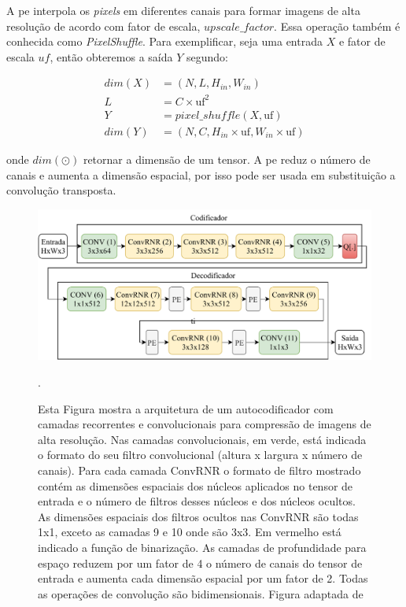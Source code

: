 A \acrshort{pe} interpola os \textit{pixels} em diferentes canais para formar imagens de alta resolução de acordo com fator de escala, $upscale\_factor$. Essa operação também é conhecida como \textit{PixelShuffle}. Para exemplificar, seja uma entrada $X$ e fator de escala $uf$, então obteremos a saída $Y$ segundo:   

\begin{equation}
\label{eq:pf}
\begin{aligned}
dim(X) &= (N,L,H_{in}, W_{in}) \\
L &=  C \times \text{uf}^2 \\ 
Y &= pixel\_shuffle(X, \text{uf}) \\
dim(Y) &= (N,C,H_{in} \times \text{uf}, W_{in}\times \text{uf}) 
\end{aligned}
\end{equation} 

onde $dim \left( \odot \right)$ retornar a dimensão de um tensor. A \acrshort{pe} reduz o número de canais e aumenta a dimensão espacial, por isso pode ser usada em substituição a convolução transposta.  

\begin{figure}[h]
	\centering
	\includegraphics[width=1.00\textwidth]{figuras/toderici_3.pdf}
	\caption[Arquitetura do autocodificador com camadas Con2DRNR]{ Esta Figura mostra a arquitetura de um autocodificador com camadas recorrentes  e convolucionais para compressão de imagens de alta resolução. Nas camadas convolucionais, em verde, está indicada o formato do seu filtro convolucional (altura x largura x número de canais). Para cada camada ConvRNR o formato de filtro mostrado contém as dimensões  espaciais dos núcleos aplicados no tensor de entrada e o número de filtros desses núcleos e dos núcleos ocultos. As dimensões espaciais dos filtros ocultos nas ConvRNR são todas 1x1, exceto as camadas 9 e 10 onde são 3x3. Em vermelho está indicado a função de binarização.  As camadas de profundidade para espaço reduzem por um fator de 4 o número de canais do tensor de entrada e aumenta cada dimensão espacial por um fator de 2. Todas as operações de convolução são bidimensionais. Figura adaptada de \cite{FullResolution2017Toderici}}.
	
	\label{fig:toderici3}
\end{figure}


